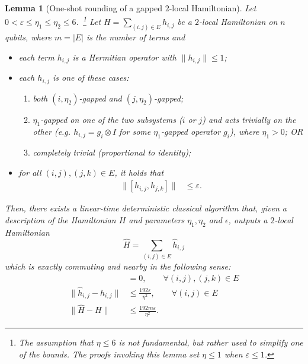 \documentclass[11pt]{article}
\theoremstyle{plain}
\newtheorem{lemma}[theorem]{Lemma}
\newcommand{\eps}{\varepsilon}
\newcommand{\AnandNote}[1]{\textcolor{red}{(Anand: #1)}}
\newcommand{\AnandNote}[1]{}
\begin{document}
\begin{lemma}[One-shot rounding of a gapped $2$-local Hamiltonian]
\label{lemma:new-rounding-hamiltonian} Let $0 < \eps \leq \eta_1 \leq \eta_2 \leq 6$.~\footnote{The assumption that $\eta \leq 6$ is not fundamental, but rather used to simplify one of the bounds. The proofs invoking this lemma set $\eta \leq 1$ when $\eps \leq 1$.}
Let $H=\sum_{(i,j) \in E} h_{i,j}$ be a $2$-local 
Hamiltonian on $n$ qubits, where $m = |E|$ is the number of terms and
\begin{itemize}
\item each term $h_{i,j}$ is a Hermitian operator with $\| h_{i,j} \| \leq 1$;
\item each $h_{i,j}$ is one of these cases:
\begin{enumerate}
    \item both $(i, \eta_2)$-gapped and $(j, \eta_2)$-gapped;
    \item $\eta_1$-gapped on one of the two subsystems ($i$ or $j$) and acts trivially on the other (e.g. $h_{i,j} = g_i \otimes I$ for some $\eta_1$-gapped operator $g_i$), where $\eta_1 >0$; OR
    \item completely trivial (proportional to identity);
\end{enumerate}
\item for all $(i,j), (j,k) \in E$, it holds that
\begin{align*}
\| [h_{i,j}, h_{j,k} ] \| &\leq \eps.
\end{align*}
\end{itemize}
Then, there exists a linear-time deterministic classical algorithm that, given a description of the Hamiltonian $H$ and parameters $\eta_1, \eta_2$ and $\epsilon$, outputs a $2$-local Hamiltonian
\[ \hat{H} = \sum_{(i,j) \in E} \hat{h}_{i,j} \]
which is exactly commuting and nearby in the following sense: 
\begin{align} 
[\hat{h}_{i,j}, \hat{h}_{j,k}] &= 0, \quad\quad \forall (i,j), (j,k) \in E\label{eq:exact-commutation} \\ 
\| \hat{h}_{i,j} - h_{i,j} \| &\leq \frac{192\eps}{\eta^2}, \quad\quad \forall (i,j) \in E\label{eq:rounding-error}\\
\|\hat{H} - H\| & \leq \frac{192 m \eps}{\eta^2}.
\label{eq:min-eigenvalue-rounded-hamiltonian}
\end{align}
\end{lemma}
\end{document}
